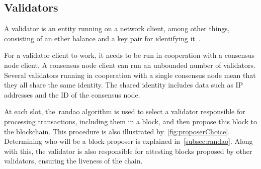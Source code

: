 %
%

\subsection{Validators}\label{subsec:validator}
A validator is an entity running on a network client, among other things, consisting of an ether balance and a key pair for identifying it~\cite{Staking}.

For a validator client to work, it needs to be run in cooperation with a consensus node client.
A consensus node client can run an unbounded number of validators.
Several validators running in cooperation with a single consensus node mean that they all share the same identity.
The shared identity includes data such as IP addresses and the ID of the consensus node.

At each slot, the~\gls{randao} algorithm is used to select a validator responsible for processing transactions,
including them in a block,
and then propose this block to the blockchain.
This procedure is also illustrated by~\autoref{fig:proposerChoice}.
Determining who will be a block proposer is explained in~\autoref{subsec:randao}.
Along with this, the validator is also responsible for attesting blocks proposed by other validators,
ensuring the liveness of the chain.


